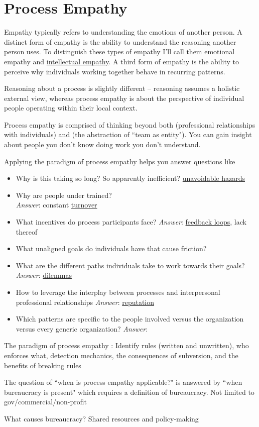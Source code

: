 \section{Process Empathy\label{sec:process-empathy}}

Empathy typically refers to understanding the emotions of another person. A distinct form of empathy is the ability to understand the reasoning another person uses. To distinguish these types of empathy I'll call them emotional empathy and \hyperref[sec:intellectual-empathy]{intellectual empathy}. A third form of empathy is the ability to perceive why individuals working together behave in recurring patterns. 

Reasoning about a process is slightly different -- reasoning assumes a holistic external view, whereas process empathy is about the perspective of individual people operating within their local context.

Process empathy is comprised of thinking beyond both (professional relationships with individuals) and (the abstraction of ``team as entity"). 
You can gain insight about people you don't know doing work you don't understand.

Applying the paradigm of process empathy helps you answer questions like
\begin{itemize}
    \item Why is this taking so long? So apparently inefficient?
\hyperref[sec:unavoidable-hazards]{unavoidable hazards}
    \item Why are people under trained?\\
\textit{Answer}: constant \hyperref[sec:turnover]{turnover}
    \item What incentives do process participants face?
\textit{Answer}:  \hyperref[sec:feedback-loop-and-ripples]{feedback loops}, lack thereof
    \item What unaligned goals do individuals have that cause friction?
    \item What are the different paths individuals take to work towards their goals?
\textit{Answer}:  \hyperref[sec:dilemma-trilemma]{dilemmas}
    \item How to leverage the interplay between processes and interpersonal professional relationships
\textit{Answer}:  \hyperref[sec:reputation]{reputation}
    \item Which patterns are specific to the people involved versus the organization versus every generic organization?
\textit{Answer}: 
\end{itemize}

The paradigm of process empathy :
Identify rules (written and unwritten), who enforces what, detection mechanics, the consequences of subversion, and the benefits of breaking rules 


The question of ``when is process empathy applicable?" is answered by ``when bureaucracy is present" which requires a definition of bureaucracy. Not limited to gov/commercial/non-profit

What causes bureaucracy? Shared resources and policy-making

